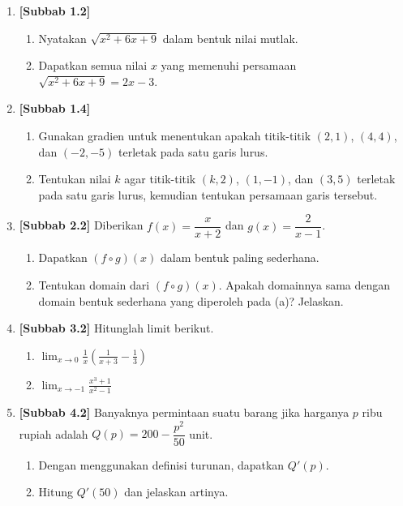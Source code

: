 \documentclass[10pt,openany,a4paper]{article}
\theoremstyle{definition}
\theoremstyle{definition}
\theoremstyle{plain}
\begin{document}
\begin{enumerate}
    \item \textbf{[Subbab 1.2]}
    \begin{enumerate}
        \item Nyatakan $\sqrt{x^2+6x+9}$ dalam bentuk nilai mutlak.
        \item Dapatkan semua nilai $x$ yang memenuhi persamaan $\sqrt{x^2+6x+9}=2x-3$.
    \end{enumerate}

    \item \textbf{[Subbab 1.4]}
    \begin{enumerate}
        \item Gunakan gradien untuk menentukan apakah titik-titik $(2,1)$, $(4,4)$, dan $(-2,-5)$ terletak pada satu garis lurus.
        \item Tentukan nilai $k$ agar titik-titik $(k,2)$, $(1,-1)$, dan $(3,5)$ terletak pada satu garis lurus, kemudian tentukan persamaan garis tersebut.
    \end{enumerate}

    \item \textbf{[Subbab 2.2]} Diberikan $f(x)=\dfrac{x}{x+2}$ dan $g(x)=\dfrac{2}{x-1}$.
    \begin{enumerate}
        \item Dapatkan $(f\circ g)(x)$ dalam bentuk paling sederhana.
        \item Tentukan domain dari $(f\circ g)(x)$. Apakah domainnya sama dengan domain bentuk sederhana yang diperoleh pada (a)? Jelaskan.
    \end{enumerate}

    \item \textbf{[Subbab 3.2]} Hitunglah limit berikut.
    \begin{enumerate}
        \item $\displaystyle\lim_{x\to 0}\frac{1}{x}\left(\frac{1}{x+3}-\frac{1}{3}\right)$
        \item $\displaystyle\lim_{x\to -1}\frac{x^3+1}{x^2-1}$
    \end{enumerate}

    \item \textbf{[Subbab 4.2]} Banyaknya permintaan suatu barang jika harganya $p$ ribu rupiah adalah $Q(p)=200-\dfrac{p^2}{50}$ unit.
    \begin{enumerate}
        \item Dengan menggunakan definisi turunan, dapatkan $Q'(p)$.
        \item Hitung $Q'(50)$ dan jelaskan artinya.
    \end{enumerate}
\end{enumerate}
\end{document}
